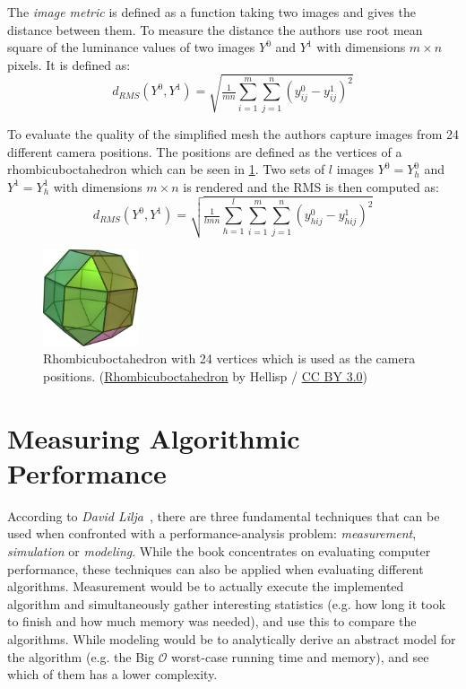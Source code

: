 The \emph{image metric} is defined as a function taking two images and gives the distance between them. To measure the distance the authors use root mean square of the luminance values of two images $Y^0$ and $Y^1$ with dimensions $m \times n$ pixels. It is defined as:
\begin{equation} \label{eq:rms_images}
  d_{RMS}(Y^0,Y^1) = \sqrt{\tfrac{1}{mn}\sum^m_{i=1}\sum^n_{j=1}(y^0_{ij} - y^1_{ij})^2}
\end{equation}

To evaluate the quality of the simplified mesh the authors capture images from 24 different camera positions. The positions are defined as the vertices of a rhombicuboctahedron which can be seen in \cref{fig:rhombicuboctahedron}. Two sets of $l$ images $Y^0 = {Y^0_h}$ and $Y^1 = {Y^1_h}$ with dimensions $m \times n$ is rendered and the RMS is then computed as:
\begin{equation}  \label{eq:rms_image_sets}
  d_{RMS}(Y^0,Y^1) = \sqrt{\tfrac{1}{lmn}\sum^l_{h=1}\sum^m_{i=1}\sum^n_{j=1}(y^0_{hij} - y^1_{hij})^2}
\end{equation}

\begin{figure}[ht]
    \centering
    \includegraphics[width=0.25\textwidth]{figures/591px-Rhombicuboctahedron.jpg}
    \caption{Rhombicuboctahedron with 24 vertices which is used as the camera positions. 
      (\href{https://commons.wikimedia.org/wiki/File:Rhombicuboctahedron.jpg}{Rhombicuboctahedron} by Hellisp / \href{https://creativecommons.org/licenses/by/3.0/}{CC BY 3.0})}
    \label{fig:rhombicuboctahedron}
\end{figure}

\section{Measuring Algorithmic Performance} \label{sec:measuring_algorithmic_performance}

According to \emph{David Lilja}~\cite[p.~4]{lilja2005measuring}, there are three fundamental techniques that can be used when confronted with a performance-analysis problem: \emph{measurement}, \emph{simulation} or \emph{modeling}. While the book concentrates on evaluating computer performance, these techniques can also be applied when evaluating different algorithms. Measurement would be to actually execute the implemented algorithm and simultaneously gather interesting statistics (e.g. how long it took to finish and how much memory was needed), and use this to compare the algorithms. While modeling would be to analytically derive an abstract model for the algorithm (e.g. the Big \(\mathcal{O}\) worst-case running time and memory), and see which of them has a lower complexity.

